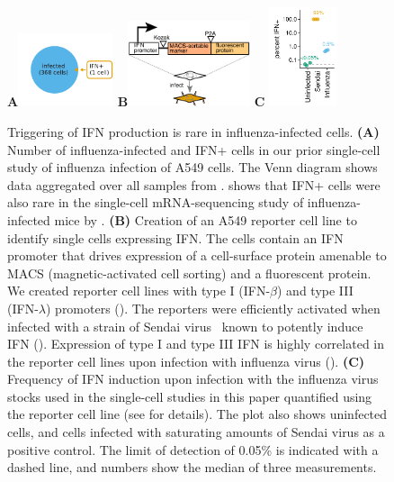 \documentclass[9pt,lineno]{elife}
\begin{document}
\begin{figure}
\centerline{
{\bf \Large A}\includegraphics[width=0.25\textwidth,valign=t]{figures/IFN_stochastic/RussellVenn/venn_diagram.pdf}
\hspace{0.02\textwidth}
{\bf \Large B}\includegraphics[width=0.32\textwidth,valign=t]{figures/IFN_stochastic/IFN_reporter/IFN_reporter.pdf}
\hspace{0.02\textwidth}
{\bf \Large C} \includegraphics[width=0.18\textwidth,valign=t]{figures/IFN_stochastic/Flow/ifn_percent.pdf}
}
\caption{
Triggering of IFN production is rare in influenza-infected cells.
{\bf (A)} Number of influenza-infected and IFN+ cells in our prior single-cell study of influenza infection of A549 cells.
The Venn diagram shows data aggregated over all samples from \citet{russell2018extreme}.
 shows that IFN+ cells were also rare in the single-cell mRNA-sequencing study of influenza-infected mice by \citet{steuerman2018dissection}.
{\bf (B)} Creation of an A549 reporter cell line to identify single cells expressing IFN.
The cells contain an IFN promoter that drives expression of a cell-surface protein amenable to MACS (magnetic-activated cell sorting) and a fluorescent protein.
We created reporter cell lines with type I (IFN-$\beta$) and type III (IFN-$\lambda$) promoters ().
The reporters were efficiently activated when infected with a strain of Sendai virus~\citep{strahle2006sendai} known to potently induce IFN ().
Expression of type I and type III IFN is highly correlated in the reporter cell lines upon infection with influenza virus ().
{\bf (C)}
Frequency of IFN induction upon infection with the influenza virus stocks used in the single-cell studies in this paper quantified using the reporter cell line (see  for details).
The plot also shows uninfected cells, and cells infected with saturating amounts of Sendai virus as a positive control.
The limit of detection of 0.05\% is indicated with a dashed line, and numbers show the median of three measurements.
}
\label{fig:IFNrare}


\end{figure}
\end{document}
